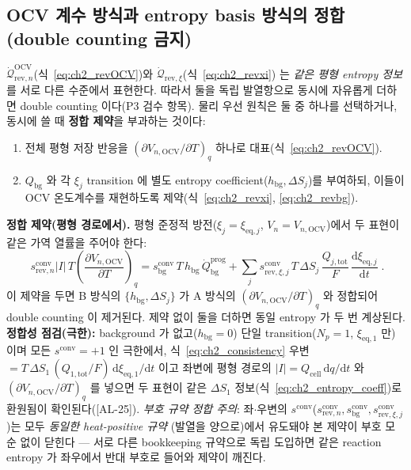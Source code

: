 \documentclass[11pt,a4paper]{article}
\newcommand{\dd}{\mathrm{d}}
\newcommand{\eq}{\mathrm{eq}}
\newcommand{\bg}{\mathrm{bg}}
\newcommand{\cell}{\mathrm{cell}}
\newcommand{\OCV}{\mathrm{OCV}}
\newcommand{\tot}{\mathrm{tot}}
\newcommand{\rev}{\mathrm{rev}}
\newcommand{\conv}{\mathrm{conv}}
\newcommand{\prog}{\mathrm{prog}}
\newcommand{\AL}[1]{\textsf{[AL-#1]}}
\begin{document}
\subsection{OCV 계수 방식과 entropy basis 방식의 정합 (double counting 금지)}\label{sec:ch2_double}
$\dot{\mathcal Q}_{\rev,n}^{\OCV}$(식~\eqref{eq:ch2_revOCV})와 $\dot{\mathcal Q}_{\rev,\xi}$(식~\eqref{eq:ch2_revxi})
는 \emph{같은 평형 entropy 정보}를 서로 다른 수준에서 표현한다. 따라서 둘을 독립 발열항으로 동시에 자유롭게 더하면
double counting 이다(P3 검수 항목). 물리 우선 원칙은 둘 중 하나를 선택하거나, 동시에 쓸 때 \textbf{정합 제약}을
부과하는 것이다:
\begin{enumerate}[label=\Alph*),leftmargin=2.0em]
\item 전체 평형 저장 반응을 $(\partial V_{n,\OCV}/\partial T)_q$ 하나로 대표(식~\eqref{eq:ch2_revOCV}).
\item $Q_\bg$ 와 각 $\xi_j$ transition 에 별도 entropy coefficient($h_\bg,\Delta S_j$)를 부여하되, 이들이
  OCV 온도계수를 재현하도록 제약(식~\eqref{eq:ch2_revxi}, \eqref{eq:ch2_revbg}).
\end{enumerate}
\textbf{정합 제약(평형 경로에서).} 평형 준정적 방전($\xi_j=\xi_{\eq,j}$, $V_n=V_{n,\OCV}$)에서 두 표현이 같은
가역 열률을 주어야 한다:
\begin{equation}
\boxed{\;s_{\rev,n}^{\conv}|I|\,T\left(\frac{\partial V_{n,\OCV}}{\partial T}\right)_q
=s_\bg^{\conv}\,T\,h_\bg\,\dot Q_\bg^{\prog}
+\sum_{j}s_{\rev,\xi,j}^{\conv}\,T\,\Delta S_j\,\frac{Q_{j,\tot}}{F}\,\frac{\dd\xi_{\eq,j}}{\dd t}\;.}
\label{eq:ch2_consistency}
\end{equation}
이 제약을 두면 B 방식의 $\{h_\bg,\Delta S_j\}$ 가 A 방식의 $(\partial V_{n,\OCV}/\partial T)_q$ 와 정합되어
double counting 이 제거된다. 제약 없이 둘을 더하면 동일 entropy 가 두 번 계상된다. \textbf{정합성 점검(극한):}
background 가 없고($h_\bg=0$) 단일 transition($N_p=1$, $\xi_{\eq,1}$ 만) 이며 모든 $s^{\conv}=+1$ 인 극한에서,
식~\eqref{eq:ch2_consistency} 우변 $=T\,\Delta S_1\,(Q_{1,\tot}/F)\,\dd\xi_{\eq,1}/\dd t$ 이고 좌변에 평형
경로의 $|I|=Q_\cell\,\dd q/\dd t$ 와 $(\partial V_{n,\OCV}/\partial T)_q$ 를 넣으면 두 표현이 같은 $\Delta S_1$
정보(식~\eqref{eq:ch2_entropy_coeff})로 환원됨이 확인된다(\AL{25}). \emph{부호 규약 정합 주의}: 좌$\cdot$우변의
$s^{\conv}$($s_{\rev,n}^{\conv},s_\bg^{\conv},s_{\rev,\xi,j}^{\conv}$)는 모두 \emph{동일한 heat-positive 규약}
(발열을 양으로)에서 유도돼야 본 제약이 부호 모순 없이 닫힌다 — 서로 다른 bookkeeping 규약으로 독립 도입하면 같은
reaction entropy 가 좌우에서 반대 부호로 들어와 제약이 깨진다.
\end{document}
